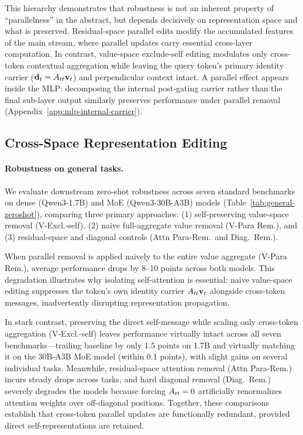 This hierarchy demonstrates that robustness is not an inherent property of
``parallelness'' in the abstract, but depends decisively on representation space
and what is preserved. Residual-space parallel edits modify the accumulated
features of the main stream, where parallel updates carry essential cross-layer
computation. In contrast, value-space exclude-self editing modulates only
cross-token contextual aggregation while leaving the query token's primary
identity carrier ($\mathbf{d}_t = A_{tt}\mathbf{v}_t$) and perpendicular context
intact. A parallel effect appears inside the MLP: decomposing the internal
post-gating carrier rather than the final sub-layer output similarly preserves
performance under parallel removal (Appendix~\ref{app:mlp-internal-carrier}).

\subsection{Cross-Space Representation Editing}
\label{sec:value-vs-residual-exp}

\paragraph{Robustness on general tasks.}
We evaluate downstream zero-shot robustness across seven standard benchmarks on
dense (Qwen3-1.7B) and MoE (Qwen3-30B-A3B) models (Table~\ref{tab:general-zeroshot}),
comparing three primary approaches: (1) self-preserving value-space removal
(V-Excl.-self), (2) naive full-aggregate value removal (V-Para Rem.), and (3)
residual-space and diagonal controls (Attn Para-Rem.\ and Diag.\ Rem.).

When parallel removal is applied naively to the entire value aggregate (V-Para Rem.),
average performance drops by 8--10 points across both models. This degradation
illustrates why isolating self-attention is essential: naive value-space editing
suppresses the token's own identity carrier $A_{tt}\mathbf{v}_t$ alongside
cross-token messages, inadvertently disrupting representation propagation.

In stark contrast, preserving the direct self-message while scaling only
cross-token aggregation (V-Excl.-self) leaves performance virtually intact across
all seven benchmarks—trailing baseline by only 1.5 points on 1.7B and virtually
matching it on the 30B-A3B MoE model (within 0.1 points), with slight gains on
several individual tasks. Meanwhile, residual-space attention removal (Attn
Para-Rem.) incurs steady drops across tasks, and hard diagonal removal (Diag.\ Rem.)
severely degrades the models because forcing $A_{tt}=0$ artificially renormalizes
attention weights over off-diagonal positions. Together, these comparisons
establish that cross-token parallel updates are functionally redundant, provided
direct self-representations are retained.

